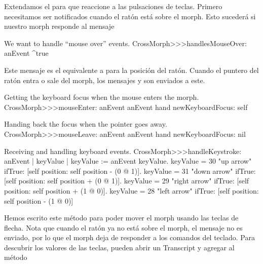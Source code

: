 \documentclass[a4paper,10pt,twoside]{book}
\begin{document}
Extendamos el  para que reaccione a las pulsaciones de teclas.
Primero necesitamos ser notificados cuando el rat\'on est\'a sobre el morph.
Esto suceder\'a si nuestro morph responde  al mensaje 

\begin{method}{We want to handle ``mouse over'' events.} 
CrossMorph>>>handlesMouseOver: anEvent
	^true
\end{method}

\noindent
Este mensaje es el equivalente a  para la posici\'on del rat\'on.
Cuando el puntero del rat\'on entra o sale del morph, los mensajes  y  son enviados a este.

\begin{method}{Getting the keyboard focus when the mouse enters the morph.}
CrossMorph>>>mouseEnter: anEvent
	anEvent hand newKeyboardFocus: self
\end{method}

\begin{method}{Handing back the focus when the pointer goes away.}
CrossMorph>>>mouseLeave: anEvent
	anEvent hand newKeyboardFocus: nil
\end{method}

\begin{method}[handleKeystroke]{Receiving and handling keyboard events.}
CrossMorph>>>handleKeystroke: anEvent
	| keyValue |
	keyValue := anEvent keyValue.
	keyValue = 30	 "up arrow"
		ifTrue: [self position: self position - (0 @ 1)].
	keyValue = 31	 "down arrow"
		ifTrue: [self position: self position + (0 @ 1)].
	keyValue = 29	 "right arrow"
		ifTrue: [self position: self position + (1 @ 0)].
	keyValue = 28	 "left arrow"
		ifTrue: [self position: self position - (1 @ 0)]
\end{method}

Hemos escrito este m\'etodo  para poder mover el morph usando las teclas de flecha.
Nota que cuando el rat\'on ya no est\'a sobre el morph, el mensaje  no es enviado, por lo que el morph deja de responder a los comandos del teclado.
Para descubrir los valores de las teclas, pueden abrir un Transcript y agregar   al método  
\end{document}
